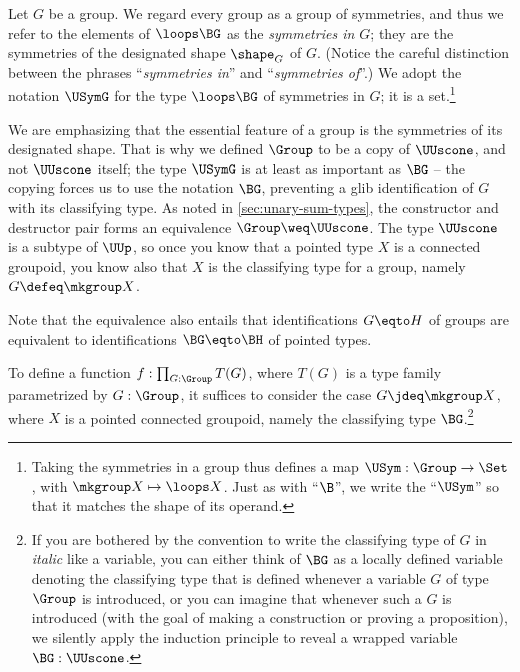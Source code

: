 \begin{definition}\label{def:group-symmetries}
  Let $G$ be a group.
  We regard every group as a group of symmetries,
  and thus we refer to the elements of $\loops \BG$ as the
  \emph{symmetries in $G$};
  they are the symmetries of the designated shape $\shape_G$ of $G$.
  (Notice the careful distinction between the phrases
  ``\emph{symmetries in}'' and ``\emph{symmetries of}''.)
  We adopt the notation $\USymG$ for the type $\loops \BG$ of symmetries in $G$;
  it is a set.\footnote{%
    Taking the symmetries in a group
    thus defines a map
    $\USym : \Group \to \Set$,
    with $\mkgroup X \mapsto \loops X$.
    Just as with ``$\B$'', we write the ``$\USym$'' so that it matches
    the shape of its operand.}
\end{definition}

\begin{remark}\label{rem:aut}
  We are emphasizing that the essential feature of a group
  is the symmetries of its designated shape.
  That is why we defined $\Group$ to be a copy of $\UUscone$,
  and not $\UUscone$ itself;
  the type $\USymG$ is at least as important as $\BG$
  -- the copying forces us to use the notation $\BG$,
  preventing a glib identification of $G$ with its classifying type.
  As noted in \cref{sec:unary-sum-types},
  the constructor and destructor pair forms an equivalence $\Group \weq \UUscone$.
  The type $\UUscone$ is a subtype of $\UUp$, so
  once you know that a pointed type $X$ is a connected groupoid,
  you know also that $X$ is the classifying type for a group,
  namely $G\defeq\mkgroup X$.

  Note that the equivalence also entails
  that identifications $G \eqto H$ of groups are equivalent
  to identifications $\BG \eqto \BH$ of pointed types.
\end{remark}

\begin{remark}\label{rem:BG-convention}
  To define a function $f : \prod_{G:\Group}T(G)$,
  where $T(G)$ is a type family parametrized by $G:\Group$,
  it suffices to consider the case $G\jdeq\mkgroup X$,
  where $X$ is a pointed connected groupoid,
  namely the classifying type $\BG$.\footnote{%
    If you are bothered by the convention
    to write the classifying type of $G$ in \emph{italic} like a variable,
    you can either think of $\BG$ as a locally defined
    variable denoting the classifying type that is
    defined whenever a variable $G$ of type $\Group$ is introduced,
    or you can imagine that whenever such a $G$ is introduced
    (with the goal of making a construction or proving a proposition),
    we silently apply the induction principle to
    reveal a wrapped variable $\BG:\UUscone$.}
\end{remark}

